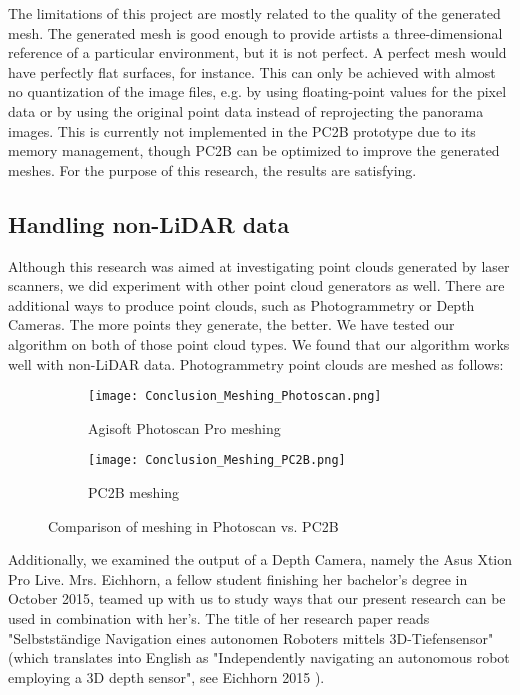 The limitations of this project are mostly related to the quality of the generated mesh. The generated mesh is good enough to provide artists a three-dimensional reference of a particular environment, but it is not perfect. A perfect mesh would have perfectly flat surfaces, for instance. This can only be achieved with almost no quantization of the image files, e.g. by using floating-point values for the pixel data or by using the original point data instead of reprojecting the panorama images. This is currently not implemented in the PC2B prototype due to its memory management, though PC2B can be optimized to improve the generated meshes. For the purpose of this research, the results are satisfying.


\subsection{Handling non-LiDAR data}

Although this research was aimed at investigating point clouds generated by laser scanners, we did experiment with other point cloud generators as well. There are additional ways to produce point clouds, such as Photogrammetry or Depth Cameras. The more points they generate, the better. We have tested our algorithm on both of those point cloud types. We found that our algorithm works well with non-LiDAR data. Photogrammetry point clouds are meshed as follows:

\begin{figure}[h]
	\centering
	\begin{subfigure}[b]{0.49\textwidth}
		\centering
		\texttt{[image: Conclusion\_Meshing\_Photoscan.png]}
		\caption{Agisoft Photoscan Pro meshing}
		\label{fig:conclusion_meshing_photoscan}
	\end{subfigure}
	\hfill
	\begin{subfigure}[b]{0.49\textwidth}
		\centering
		\texttt{[image: Conclusion\_Meshing\_PC2B.png]}
		\caption{PC2B meshing}
		\label{fig:conclusion_meshing_pc2b}
	\end{subfigure}
	\caption{Comparison of meshing in Photoscan vs. PC2B}
	\label{fig:conclusion_meshing_photoscan_vs_pc2b}
\end{figure}

\pagebreak

Additionally, we examined the output of a Depth Camera, namely the Asus Xtion Pro Live. Mrs. Eichhorn, a fellow student finishing her bachelor's degree in October 2015, teamed up with us to study ways that our present research can be used in combination with her's. The title of her research paper reads "Selbstständige Navigation eines autonomen Roboters mittels 3D-Tiefensensor" (which translates into English as "Independently navigating an autonomous robot employing a 3D depth sensor", see Eichhorn 2015 \parencite{anja_eichhorn}).\\

